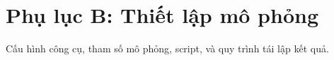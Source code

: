 \chapter{Phụ lục B: Thiết lập mô phỏng}
Cấu hình công cụ, tham số mô phỏng, script, và quy trình tái lập kết quả.


